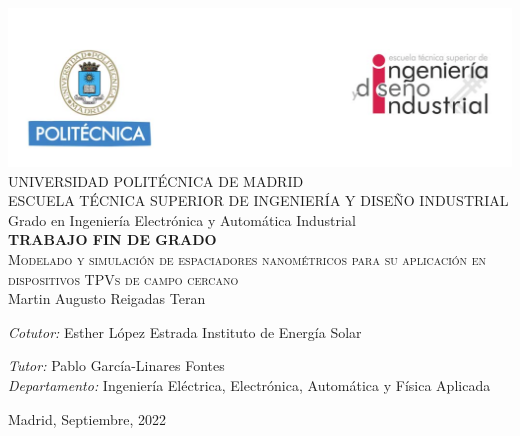 \begin{titlepage}
\begin{center}
\includegraphics[width=1\textwidth]{figuras/cabecera.png}  \\[0.5 cm]

\LARGE UNIVERSIDAD POLITÉCNICA DE MADRID \\ [1 cm]

\LARGE ESCUELA TÉCNICA SUPERIOR DE INGENIERÍA Y DISEÑO INDUSTRIAL \\ [1 cm]

\LARGE Grado en Ingeniería Electrónica y Automática Industrial\\ [1 cm]

\LARGE \textbf{TRABAJO FIN DE GRADO}\\[1 cm]

\Huge \textsc{Modelado y simulación de espaciadores nanométricos para su aplicación en dispositivos TPVs de campo cercano}\\[1 cm]

\LARGE Martin Augusto Reigadas Teran \\[0.5 cm]
\begin{multicols}{2} 
\begin{flushleft} \Large
\emph{Cotutor:} Esther López Estrada
Instituto de Energía Solar
\end{flushleft}
\begin{flushleft} \Large
\emph{Tutor:} Pablo García-Linares Fontes\\
\emph{Departamento:} Ingeniería Eléctrica, Electrónica, Automática y Física Aplicada
\end{flushleft}
\end{multicols} 

\vfill

{\large Madrid, Septiembre, 2022}

\cleardoublepage 
\end{center}
\end{titlepage}

